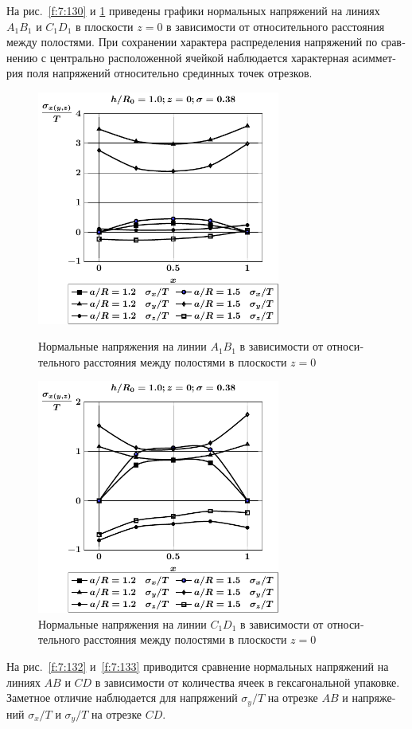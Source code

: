 \begin{russian}
На рис.~\ref{f:7:130} и \ref{f:7:131} приведены графики нормальных напряжений на линиях $A_1B_1$ и $C_1D_1$ в плоскости $z=0$ в зависимости от относительного расстояния между полостями. При сохранении характера распределения напряжений по сравнению с центрально расположенной ячейкой наблюдается характерная асимметрия поля напряжений относительно срединных точек отрезков.

\begin{figure}[h!]
\centering\footnotesize
\parbox[b]{7.5cm}{\centering\includegraphics[width=8cm]{cav24-a-h10-r10-z0-a1b1.pdf}
\caption{Нормальные напряжения на линии $A_1B_1$ в зависимости от относительного расстояния между полостями в плоскости $z=0$
\label{f:7:130}}}\hfil\hfil
\parbox[b]{7.5cm}{\centering\includegraphics[width=8cm]{cav24-a-h10-r10-z0-c1d1.pdf}
\caption{Нормальные напряжения на линии $C_1D_1$ в зависимости от относительного расстояния между полостями в плоскости $z=0$
\label{f:7:131}}}
\end{figure}

На рис.~\ref{f:7:132} и~\ref{f:7:133} приводится сравнение нормальных напряжений на линиях $AB$ и $CD$ в зависимости от количества ячеек в гексагональной упаковке. Заметное отличие наблюдается для напряжений $\sigma_y/T$ на отрезке $AB$ и напряжений $\sigma_x/T$ и $\sigma_y/T$ на отрезке $CD$.


\end{russian}
